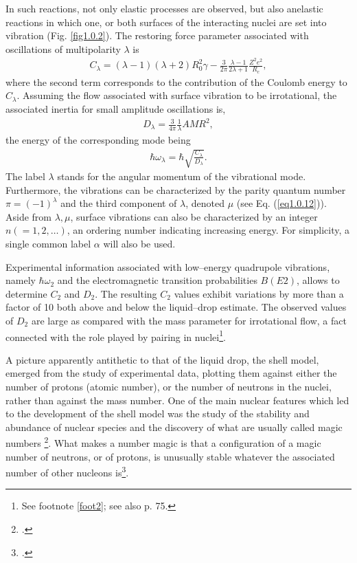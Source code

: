 In such reactions, not only elastic processes are observed, but also anelastic reactions in which one, or both  surfaces of the interacting nuclei are set into vibration (Fig. \ref{fig1.0.2}). The restoring force parameter associated with oscillations of multipolarity $\lambda$ is 
\begin{align}\label{eq1.0.4b}
C_\lambda=(\lambda-1)(\lambda+2)R_0^2\gamma-\frac{3}{2\pi}\frac{\lambda-1}{2\lambda+1}\frac{Z^2e^2}{R_c},
\end{align}
where the second term corresponds to the contribution of the Coulomb energy to $C_\lambda$. Assuming the flow associated with surface vibration to be irrotational, the associated inertia for small amplitude oscillations is, 
\begin{align}\label{eq1.0.5}
D_{\lambda}=\frac{3}{4\pi}\frac{1}{\lambda}AMR^2,
\end{align}
the energy of the corresponding mode being
\begin{align}\label{eq1.0.6}
\hbar\omega_\lambda=\hbar\sqrt{\frac{C_\lambda}{D_\lambda}}.
\end{align}
The label $\lambda$ stands for the angular momentum of the vibrational mode. Furthermore, the vibrations can be characterized by the parity quantum number $\pi=(-1)^\lambda$ and the third component of $\lambda$, denoted $\mu$  (see Eq. (\ref{eq1.0.12})). Aside from $\lambda,\mu$, surface vibrations can also be characterized by an integer $n(=1,2,\dots)$, an ordering number indicating increasing energy. For simplicity, a single common label $\alpha$ will  also be used.


Experimental information associated with low--energy quadrupole vibrations, namely $\hbar\omega_{2}$ and the electromagnetic transition probabilities $B(E2)$, allows to determine $C_2$ and $D_2$. The resulting $C_2$ values exhibit variations by more than a factor of 10 both above and below the liquid--drop estimate. The observed values of $D_2$ are large as compared with the mass parameter for irrotational flow, a fact connected with the role played by pairing in nuclei\footnote{See footnote \ref{foot2}; see also \cite{Bohr:75} p. 75.}.

A picture apparently antithetic to that of the liquid drop, the shell model, emerged from the study of experimental data, plotting them against either the number of protons (atomic number), or the number of neutrons in the nuclei, rather than against the mass number.
One of the main nuclear features which led to the development of the shell model was the study of the stability and abundance of nuclear species and the discovery of what are usually called magic numbers \footnote{\cite{Elsasser:33,Mayer:48,Haxel:49}.}. What makes a number magic is that a configuration of a magic number of neutrons, or of protons, is unusually stable whatever the associated number of other nucleons is\footnote{\cite{Mayer:49,Mayer:49b}.}.


